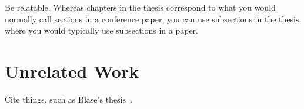 Be relatable. Whereas chapters in the thesis correspond to what you would normally call sections in a conference paper, you can use subsections in the thesis where you would typically use subsections in a paper.

\section{Unrelated Work}

Cite things, such as Blase's thesis~\cite{ur2016supporting}.
